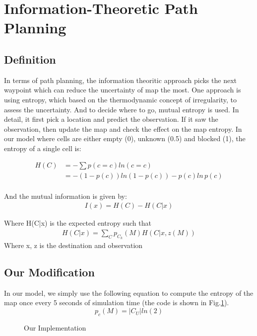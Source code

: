 \documentclass{article}
\begin{document}
\section{Information-Theoretic Path Planning}
\subsection {Definition}
In terms of path planning, the information theoritic approach picks the next waypoint which can reduce the uncertainty of map the most. One approach is using entropy, which based on the thermodynamic concept of irregularity, to assess the uncertainty. And to decide where to go, mutual entropy is used. In detail, it first pick a location and predict the observation. If it saw the observation, then update the map and check the effect on the map entropy. In our model where cells are either empty (0), unknown (0.5) and blocked (1), the entropy of a single cell is:

\begin{align}
H(C) &= - \sum p(c=c)ln(c=c) \\
         &= -(1-p(c))ln(1-p(c)) - p(c)ln\,p(c) \\
\end{align}

And the mutual information is given by:
\begin{align}
I(x) = H(C) - H(C|x) 
\end{align}

Where H(C|x) is the expected entropy  such that 
\begin{align}
H(C|x)= \sum_{C}p_{C_{k}} (M) H(C|x, z(M))
\end{align}
Where x, z is the destination and observation
\subsection{Our Modification}
In our model, we simply use the following equation to compute the entropy of the map once every 5 seconds of simulation time (the code is shown in Fig.\ref{fig:calculateEntropy}).
\begin{equation}
p_{c}(M) = |C_{U}|ln(2)
\end{equation}

\begin{figure}[H]
\centering  
{}
\caption{Our Implementation}
\label{fig:calculateEntropy}
\end{figure}
\end{document}
